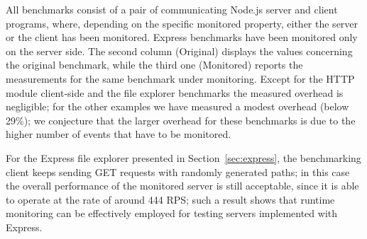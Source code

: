 All benchmarks consist of a pair of communicating Node.js server and client programs, where, depending on the specific
monitored property, either the server or the client has been monitored. Express benchmarks have been monitored only on the server side.
The second column (Original) displays the values concerning the original benchmark, while the third one
(Monitored) reports the measurements for the same benchmark under monitoring.
Except for the HTTP module client-side and the file explorer benchmarks the measured overhead is negligible;
for the other examples we have measured a modest overhead (below 29\%); we conjecture that the larger overhead
for these benchmarks is due to the higher number of events that have to be monitored.

For the Express file explorer presented in Section~\ref{sec:express}, the benchmarking client keeps sending GET requests
with randomly generated paths; in this case the overall performance of the monitored server is still acceptable, since it is able to operate at the rate of around 444 RPS; such a result shows that runtime monitoring can be effectively
employed for testing servers implemented with Express.

